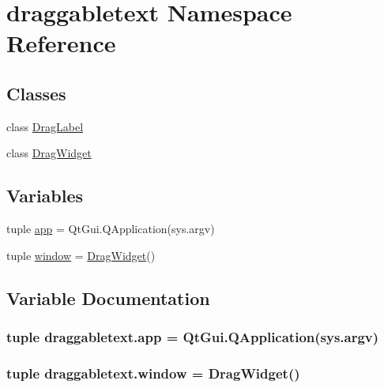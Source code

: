 \hypertarget{namespacedraggabletext}{}\section{draggabletext Namespace Reference}
\label{namespacedraggabletext}
\subsection*{Classes}
\begin{DoxyCompactItemize}
\item 
class \hyperlink{classdraggabletext_1_1DragLabel}{Drag\+Label}
\item 
class \hyperlink{classdraggabletext_1_1DragWidget}{Drag\+Widget}
\end{DoxyCompactItemize}
\subsection*{Variables}
\begin{DoxyCompactItemize}
\item 
tuple \hyperlink{namespacedraggabletext_a51c4615c07786ddd331d27ac5585048f}{app} = Qt\+Gui.\+Q\+Application(sys.\+argv)
\item 
tuple \hyperlink{namespacedraggabletext_ab33ec26072fec353e877727f2f9033fc}{window} = \hyperlink{classdraggabletext_1_1DragWidget}{Drag\+Widget}()
\end{DoxyCompactItemize}


\subsection{Variable Documentation}
\hypertarget{namespacedraggabletext_a51c4615c07786ddd331d27ac5585048f}{}
\subsubsection[{app}]{\setlength{\rightskip}{0pt plus 5cm}tuple draggabletext.\+app = Qt\+Gui.\+Q\+Application(sys.\+argv)}\label{namespacedraggabletext_a51c4615c07786ddd331d27ac5585048f}
\hypertarget{namespacedraggabletext_ab33ec26072fec353e877727f2f9033fc}{}
\subsubsection[{window}]{\setlength{\rightskip}{0pt plus 5cm}tuple draggabletext.\+window = {\bf Drag\+Widget}()}\label{namespacedraggabletext_ab33ec26072fec353e877727f2f9033fc}
